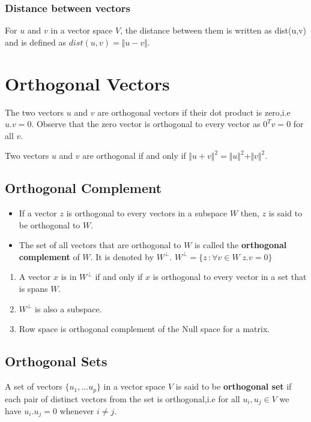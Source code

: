 \documentclass[aima104_lecturenotes_ku.tex]{subfiles}
\begin{document}
\subsubsection{Distance between vectors}
For $u$ and $v$ in a vector space $V$, the distance between them is written as dist(u,v) and is defined as $dist(u,v) = \Vert u-v \Vert$.

\section{Orthogonal Vectors}
The two vectors $u$ and $v$ are orthogonal vectors if their dot product is zero,i.e $u.v = 0$. Observe that the zero vector is orthogonal to every vector as $0^Tv=0$ for all $v$.
\begin{thm}
  Two vectors $u$ and $v$ are orthogonal if and only if $\Vert u + v \Vert ^2 = \Vert u \Vert ^2 + \Vert v \Vert ^2$.
\end{thm}

\subsection{Orthogonal Complement}
\begin{itemize}
\item If a vector $z$ is orthogonal to every vectors in a subspace $W$ then, $z$ is said to be orthogonal to $W$.

\item The set of all vectors that are orthogonal to $W$ is called the \textbf{orthogonal complement} of $W$. It is denoted by $W^{\perp}$. $W^{\perp} = \{z \, : \forall v \in W \;  z.v=0 \} $
\end{itemize}

\begin{thm}
  \begin{enumerate}
  \item A vector $x$ is in $W^{\perp}$ if and only if $x$ is orthogonal to every vector in a set that is spans $W$.
  \item $W^{\perp}$ is also a subspace.
   \item Row space is orthogonal complement of the Null space for a matrix.
  \end{enumerate}
\end{thm}

\subsection{Orthogonal Sets}
A set of vectors $\{ u_1, ...u_p\}$ in a vector space $V$ is said to be \textbf{orthogonal set} if each pair of distinct vectors from the set is orthogonal,i.e for all $u_i, u_j \in V$ we have $u_i.u_j = 0$ whenever $i \neq j$.
\end{document}
